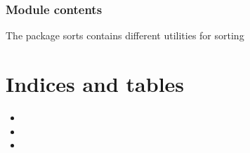\documentclass[letterpaper,10pt,english]{sphinxmanual}
\begin{document}
\subsection{Module contents}
\label{\detokenize{sorts:module-sorts}}\label{\detokenize{sorts:module-contents}}
\sphinxAtStartPar
The package sorts contains different utilities for sorting


\chapter{Indices and tables}
\label{\detokenize{index:indices-and-tables}}\begin{itemize}
\item {} 
\sphinxAtStartPar
{}

\item {} 
\sphinxAtStartPar
{}

\item {} 
\sphinxAtStartPar
{}

\end{itemize}


\renewcommand{\indexname}{Python Module Index}
\begin{sphinxtheindex}
\let\bigletter\sphinxstyleindexlettergroup
\bigletter{s}
\item\relax{}
\item\relax{}
\item\relax{}
\end{sphinxtheindex}

\renewcommand{\indexname}{Index}
\printindex
\end{document}
